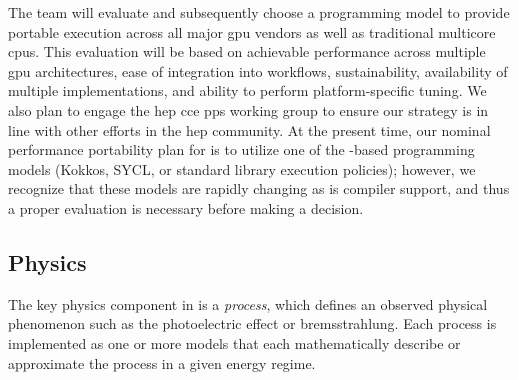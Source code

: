The \celeritas team will evaluate and subsequently choose a programming model to
provide portable execution across all major \ac{gpu} vendors as well as
traditional multicore \acp{cpu}. This evaluation will be based on achievable
performance across multiple \ac{gpu} architectures, ease of integration into
\celeritas workflows, sustainability, availability of multiple implementations,
and ability to perform platform-specific tuning. We also plan to engage the
\ac{hep} \ac{cce} \ac{pps} working group to ensure our strategy is in line with
other efforts in the \ac{hep} community. At the present time, our nominal
performance portability plan for \celeritas is to utilize one of the \Cpp-based
programming models (Kokkos, SYCL, or \Cpp standard library execution policies);
however, we recognize that these models are rapidly changing as is compiler
support, and thus a proper evaluation is necessary before making a decision.


\subsection{Physics}

The key physics component in \celeritas is a \emph{process}, which defines an
observed physical phenomenon such as the photoelectric effect or bremsstrahlung.
Each process is implemented as one or more models that each mathematically
describe or approximate the process in a given energy regime.

